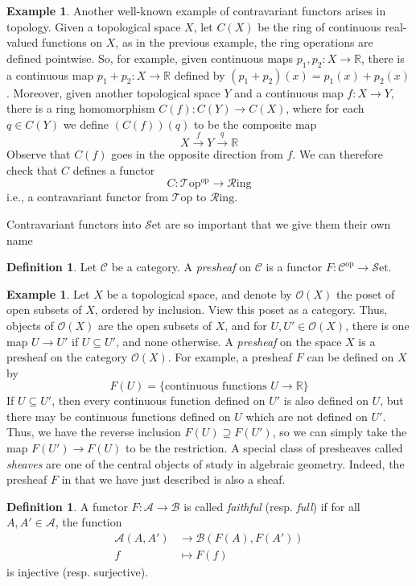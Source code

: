 \documentclass[10pt,oneside]{book}
\def\~#1{\mathscr{#1}}
\def\To#1{\xrightarrow{#1}}
\newcommand{\R}{\mathbb{R}}
\newcommand{\op}{\mathrm{op}}
\newcommand{\Set}{\~S\mathrm{et}}
\newcommand{\Ring}{\~R\mathrm{ing}}
\newcommand{\Top}{\~T\mathrm{op}}
\theoremstyle{plain}
\theoremstyle{definition}
\newtheorem{defn}[thm]{Definition}
\newtheorem{ex}[thm]{Example}
\theoremstyle{remark}
\numberwithin{equation}{section}
\numberwithin{figure}{section}
\begin{document}
\begin{ex}
    Another well-known example of contravariant functors arises in topology. Given a topological space $X$, let $C(X)$ be the ring of continuous real-valued functions on $X$, as in the previous example, the ring operations are defined pointwise. So, for example, given continuous maps $p_1, p_2 : X \to \R$, there is a continuous map $p_1 + p_2: X \to \R$ defined by $(p_1 + p_2)(x) = p_1(x) + p_2(x)$. Moreover, given another topological space $Y$ and a continuous map $f: X \to Y$, there is a ring homomorphism $C(f): C(Y) \to C(X)$, where for each $q \in C(Y)$ we define $(C(f))(q)$ to be the composite map
    \[X \To{f}Y \To{q} \R\]   
    Observe that $C(f)$ goes in the opposite direction from $f$. We can therefore check that $C$ defines a functor 
    \[C: \Top^\op \to \Ring\]
    i.e., a contravariant functor from $\Top$ to $\Ring$. 
\end{ex}

Contravariant functors into $\Set$ are so important that we give them their own name
\begin{defn}
\label{defn:presheaf}
    Let $\~C$ be a category. A \emph{presheaf} on $\~C$ is a functor $F: \~C^\op \to \Set$.
\end{defn}

\begin{ex}
    Let $X$ be a topological space, and denote by $\~O(X)$ the poset of open subsets of $X$, ordered by inclusion. View this poset as a category. Thus, objects of $\~O(X)$ are the open subsets of $X$, and for $U, U' \in \~O(X)$, there is one map $U \to U'$ if $U \subseteq U'$, and none otherwise. A \emph{presheaf} on the space $X$ is a presheaf on the category $\~O(X)$. For example, a presheaf $F$ can be defined on $X$ by
    \[F(U) = \{\text{continuous functions } U \to \R\}\]
    If $U \subseteq U'$, then every continuous function defined on $U'$ is also defined on $U$, but there may be continuous functions defined on $U$ which are not defined on $U'$. Thus, we have the reverse inclusion $F(U) \supseteq F(U')$, so we can simply take the map $F(U') \to F(U)$ to be the restriction. A special class of presheaves called \emph{sheaves} are one of the central objects of study in algebraic geometry. Indeed, the presheaf $F$ in that we have just described is also a sheaf.
\end{ex}

\begin{defn}
    A functor $F: \~A \to \~B$ is called \emph{faithful} (resp. \emph{full}) if for all $A, A' \in \~A$, the function
    \begin{align*}
        \~A(A, A') &\to \~B(F(A), F(A')) \\
        f &\mapsto F(f)
    \end{align*}
    is injective (resp. surjective).
\end{defn}
\end{document}
